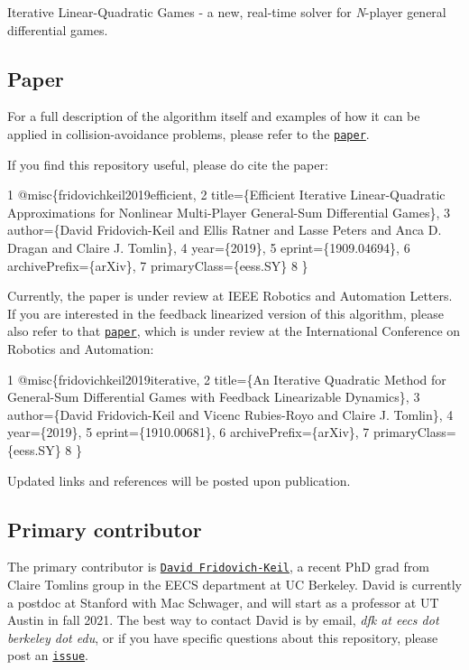  

Iterative Linear-\/\+Quadratic Games -\/ a new, real-\/time solver for {\itshape N}-\/player general differential games.

\subsection*{Paper}

For a full description of the algorithm itself and examples of how it can be applied in collision-\/avoidance problems, please refer to the \href{https://arxiv.org/abs/1909.04694}{\tt paper}.

If you find this repository useful, please do cite the paper\+: 
\begin{DoxyCode}
1 @misc\{fridovichkeil2019efficient,
2     title=\{Efficient Iterative Linear-Quadratic Approximations for Nonlinear Multi-Player General-Sum
       Differential Games\},
3     author=\{David Fridovich-Keil and Ellis Ratner and Lasse Peters and Anca D. Dragan and Claire J.
       Tomlin\},
4     year=\{2019\},
5     eprint=\{1909.04694\},
6     archivePrefix=\{arXiv\},
7     primaryClass=\{eess.SY\}
8 \}
\end{DoxyCode}
 Currently, the paper is under review at I\+E\+EE Robotics and Automation Letters. If you are interested in the feedback linearized version of this algorithm, please also refer to that \href{https://arxiv.org/abs/1910.00681}{\tt paper}, which is under review at the International Conference on Robotics and Automation\+: 
\begin{DoxyCode}
1 @misc\{fridovichkeil2019iterative,
2     title=\{An Iterative Quadratic Method for General-Sum Differential Games with Feedback Linearizable
       Dynamics\},
3     author=\{David Fridovich-Keil and Vicenc Rubies-Royo and Claire J. Tomlin\},
4     year=\{2019\},
5     eprint=\{1910.00681\},
6     archivePrefix=\{arXiv\},
7     primaryClass=\{eess.SY\}
8 \}
\end{DoxyCode}
 Updated links and references will be posted upon publication.

\subsection*{Primary contributor}

The primary contributor is \href{https://people.eecs.berkeley.edu/~dfk/}{\tt David Fridovich-\/\+Keil}, a recent PhD grad from Claire Tomlin\textquotesingle{}s group in the E\+E\+CS department at UC Berkeley. David is currently a postdoc at Stanford with Mac Schwager, and will start as a professor at UT Austin in fall 2021. The best way to contact David is by email, {\itshape dfk at eecs dot berkeley dot edu}, or if you have specific questions about this repository, please post an \href{https://github.com/HJReachability/ilqgames/issues}{\tt issue}.

